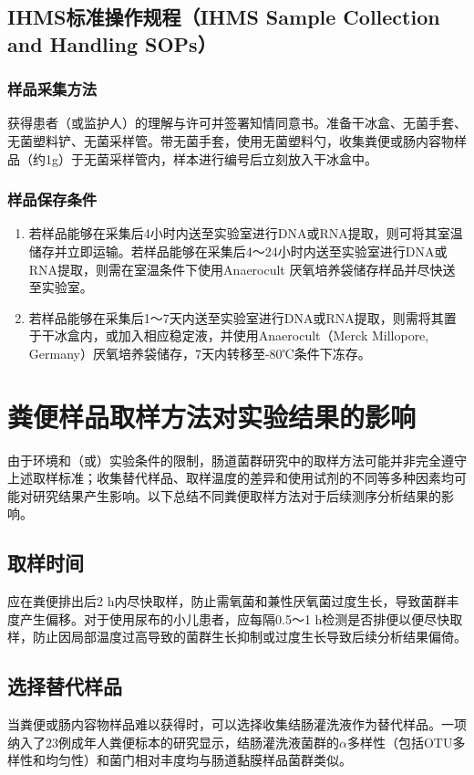 \subsection{IHMS标准操作规程（IHMS Sample Collection and Handling SOPs）}
\subsubsection{样品采集方法}
获得患者（或监护人）的理解与许可并签署知情同意书。准备干冰盒、无菌手套、无菌塑料铲、无菌采样管。带无菌手套，使用无菌塑料勺，收集粪便或肠内容物样品（约1g）于无菌采样管内，样本进行编号后立刻放入干冰盒中\cite{santiago2014processing}。
\subsubsection{样品保存条件}
\begin{enumerate}
  \item 若样品能够在采集后4小时内送至实验室进行DNA或RNA提取，则可将其室温储存并立即运输。若样品能够在采集后4～24小时内送至实验室进行DNA或RNA提取，则需在室温条件下使用Anaerocult\textsuperscript{\textregistered} 厌氧培养袋储存样品并尽快送至实验室。
  \item 若样品能够在采集后1～7天内送至实验室进行DNA或RNA提取，则需将其置于干冰盒内，或加入相应稳定液，并使用Anaerocult\textsuperscript{\textregistered}（Merck Millopore, Germany）厌氧培养袋储存，7天内转移至-80℃条件下冻存。
\end{enumerate}

\section{粪便样品取样方法对实验结果的影响}
由于环境和（或）实验条件的限制，肠道菌群研究中的取样方法可能并非完全遵守上述取样标准；收集替代样品、取样温度的差异和使用试剂的不同等多种因素均可能对研究结果产生影响。以下总结不同粪便取样方法对于后续测序分析结果的影响。
\subsection{取样时间}
应在粪便排出后2 h内尽快取样，防止需氧菌和兼性厌氧菌过度生长，导致菌群丰度产生偏移\cite{santiago2014processing}。对于使用尿布的小儿患者，应每隔0.5～1 h检测是否排便以便尽快取样\cite{shaw2016latitude}，防止因局部温度过高导致的菌群生长抑制或过度生长导致后续分析结果偏倚\cite{guo2016effect}。
\subsection{选择替代样品}
当粪便或肠内容物样品难以获得时，可以选择收集结肠灌洗液作为替代样品。一项纳入了23例成年人粪便标本的研究显示，结肠灌洗液菌群的$\alpha$多样性（包括OTU多样性和均匀性）和菌门相对丰度均与肠道黏膜样品菌群类似\cite{Watt2016}。
